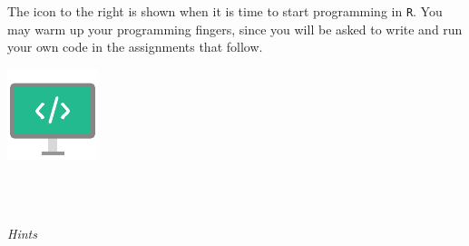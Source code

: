 \begin{minipage}{0.85\textwidth}
The icon to the right is shown when it is time to start programming in \texttt{R}. You may warm up your programming fingers, since you will be asked to write and run your own code in the assignments that follow. 
\end{minipage}%
\hfill%
\begin{minipage}{0.1\textwidth}
\includegraphics[width=\linewidth]{Files/Images/displaycode.pdf}
\end{minipage} \\
\\
\bigskip 

\textit{Hints} \\

